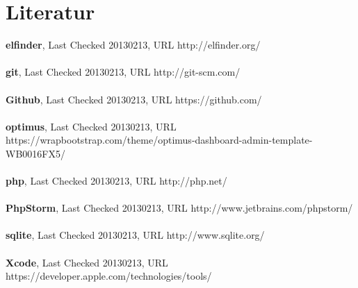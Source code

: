 \chapter*{Literatur}

\textbf{elfinder}, Last Checked 20130213, URL http://elfinder.org/ \\
\\
\textbf{git}, Last Checked 20130213, URL http://git-scm.com/ \\
\\
\textbf{Github}, Last Checked 20130213, URL https://github.com/ \\
\\
\textbf{optimus}, Last Checked 20130213, URL  https://wrapbootstrap.com/theme/optimus-dashboard-admin-template-WB0016FX5/ \\
\\
\textbf{php}, Last Checked 20130213, URL http://php.net/ \\
\\
\textbf{PhpStorm}, Last Checked 20130213, URL http://www.jetbrains.com/phpstorm/ \\
\\
\textbf{sqlite}, Last Checked 20130213, URL http://www.sqlite.org/ \\
\\
\textbf{Xcode}, Last Checked 20130213, URL https://developer.apple.com/technologies/tools/ \\
\\





